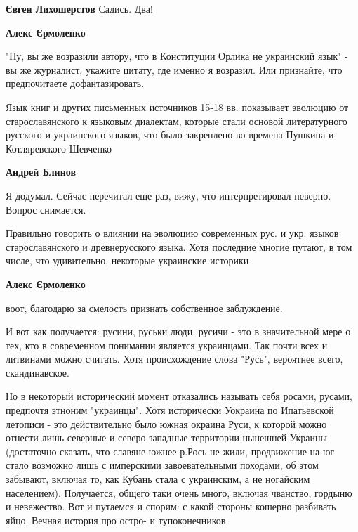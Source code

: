 \begin{itemize}
\begin{itemize}
\textbf{Євген Лихошерстов} Садись. Два!

 

\textbf{Алекс Єрмоленко} 

"Ну, вы же возразили автору, что в Конституции Орлика не украинский язык" - вы
же журналист, укажите цитату, где именно я возразил. Или признайте, что
предпочитаете дофантазировать.

Язык книг и других письменных источников 15-18 вв. показывает эволюцию от
старославянского к языковым диалектам, которые стали основой литературного
русского и украинского языков, что было закреплено во времена Пушкина и
Котляревского-Шевченко

 
\textbf{Андрей Блинов} 

Я додумал. Сейчас перечитал еще раз, вижу, что интерпретировал неверно. Вопрос
снимается.

Правильно говорить о влиянии на эволюцию современных рус. и укр. языков
старославянского и древнерусского языка. Хотя последние многие путают, в том
числе, что удивительно, некоторые украинские историки


 

\textbf{Алекс Єрмоленко} 

воот, благодарю за смелость признать собственное заблуждение.

И вот как получается: русини, руськи люди, русичи - это в значительной мере о
тех, кто в современном понимании является украинцами. Так почти всех и
литвинами можно считать. Хотя происхождение слова "Русь", вероятнее всего,
скандинавское.

Но в некоторый исторический момент отказались называть себя росами, русами,
предпочтя этноним "украинцы". Хотя исторически Уокраина по Ипатьевской летописи
- это действительно было южная окраина Руси, к которой можно отнести лишь
северные и северо-западные территории нынешней Украины (достаточно сказать, что
славяне южнее р.Рось не жили, продвижение на юг стало возможно лишь с
имперскими завоевательными походами, об этом забывают, включая то, как Кубань
стала с украинским, а не ногайским населением). Получается, общего таки очень
много, включая чванство, гордыню и невежество. Вот и путаемся и спорим: с какой
стороны кошерно разбивать яйцо. Вечная история про остро- и тупоконечников


\end{itemize}

\end{itemize}

